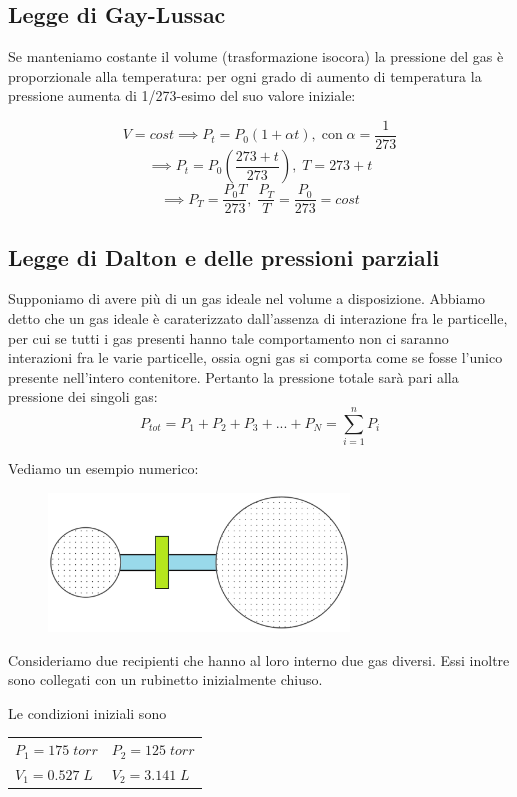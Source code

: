 \subsection{Legge di Gay-Lussac}
Se manteniamo costante il volume (trasformazione isocora) la pressione del gas è proporzionale alla temperatura: per ogni grado di aumento di temperatura la pressione aumenta di 1/273-esimo del suo valore iniziale:

$$V=cost \implies P_t=P_0(1 + \alpha t), \; \text{con} \; \alpha=\frac{1}{273}$$
$$\implies P_t=P_0 \left( \frac{273 + t}{273} \right), \; T=273 + t$$
$$\implies P_T = \frac{P_0 T}{273}, \; \frac{P_T}{T}=\frac{P_0}{273}=cost$$

\subsection{Legge di Dalton e delle pressioni parziali}
Supponiamo di avere più di un gas ideale nel volume a disposizione. Abbiamo detto che un gas ideale è caraterizzato dall'assenza di interazione fra le particelle, per cui se tutti i gas presenti hanno tale comportamento non ci saranno interazioni fra le varie particelle, ossia ogni gas si comporta come se fosse l'unico presente nell'intero contenitore. Pertanto la pressione totale sarà pari alla pressione dei singoli gas:
$$P_{tot}=P_1 + P_2 + P_3 + ... + P_N = \sum_{i=1}^nP_i$$

Vediamo un esempio numerico:

\vspace{-0.3cm}
\hspace{0.5cm}\begin{minipage}{0.55 \textwidth}
    \begin{figure}[H]
        \includegraphics[width=8cm]{immagini/serbatoio.png}
    \end{figure}
\end{minipage}
\begin{minipage}{0.4 \textwidth}
\vspace{0.8cm}Consideriamo due recipienti che hanno al loro interno due gas diversi. Essi inoltre sono collegati con un rubinetto inizialmente chiuso.

Le condizioni iniziali sono

\begin{center}
    \begin{tabular}{p{2.5cm}p{2.5cm}}
        $P_1=175 \; torr$ & $P_2=125 \; torr$\\[1ex]
        $V_1=0.527 \; L$ & $V_2=3.141 \; L$
    \end{tabular}
\end{center}
\end{minipage}

